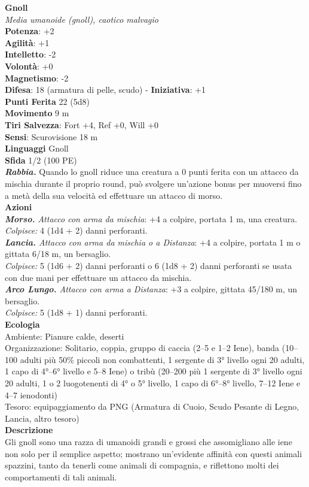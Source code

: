\begin{multicols}{2}
\medskip\textbf{Gnoll}\\
\emph{Media umanoide (gnoll), caotico malvagio}\\
\textbf{Potenza}: +2\\
\textbf{Agilità}: +1\\
\textbf{Intelletto}: -2\\
\textbf{Volontà}: +0\\
\textbf{Magnetismo}: -2\\
\textbf{Difesa}: 18 (armatura di pelle, scudo) - \textbf{Iniziativa}: +1\\
\textbf{Punti Ferita} 22 (5d8)\\
\textbf{Movimento} 9 m\\
\textbf{Tiri Salvezza}: Fort +4, Ref +0, Will +0\\
\textbf{Sensi}: Scurovisione 18 m\\
\textbf{Linguaggi} Gnoll\\
\textbf{Sfida} 1/2 (100 PE)\smallskip\\
\emph{\textbf{Rabbia.}} Quando lo gnoll riduce una creatura a 0 punti ferita con un attacco da mischia durante il proprio round, può svolgere un'azione bonus per muoversi fino a metà della sua velocità ed effettuare un attacco di morso.\\
\smallskip\textbf{Azioni}\\
\emph{\textbf{Morso.} Attacco con arma da mischia}: +4 a colpire, portata 1 m, una creatura.\\
\emph{Colpisce:} 4 (1d4 + 2) danni perforanti.\\
\emph{\textbf{Lancia.} Attacco con arma da mischia o a Distanza}: +4 a colpire, portata 1 m o gittata 6/18 m, un bersaglio.\\
\emph{Colpisce:} 5 (1d6 + 2) danni perforanti o 6 (1d8 + 2) danni perforanti se usata con due mani per effettuare un attacco da mischia.\\
\emph{\textbf{Arco Lungo.} Attacco con arma a Distanza}: +3 a colpire, gittata 45/180 m, un bersaglio.\\
\emph{Colpisce:} 5 (1d8 + 1) danni perforanti.\\
\textbf{Ecologia}\\
Ambiente: Pianure calde, deserti\\
Organizzazione: Solitario, coppia, gruppo di caccia (2–5 e 1–2 Iene), banda (10–100 adulti più 50\% piccoli non combattenti, 1 sergente di 3° livello ogni 20 adulti, 1 capo di 4°–6° livello e 5–8 Iene) o tribù (20–200 più 1 sergente di 3° livello ogni 20 adulti, 1 o 2 luogotenenti di 4° o 5° livello, 1 capo di 6°–8° livello, 7–12 Iene e 4–7 ienodonti)\\
Tesoro: equipaggiamento da PNG (Armatura di Cuoio, Scudo Pesante di Legno, Lancia, altro tesoro)\\
\textbf{Descrizione}\\
Gli gnoll sono una razza di umanoidi grandi e grossi che assomigliano alle iene non solo per il semplice aspetto; mostrano un’evidente affinità con questi animali spazzini, tanto da tenerli come animali di compagnia, e riflettono molti dei comportamenti di tali animali.\\


\end{multicols}
